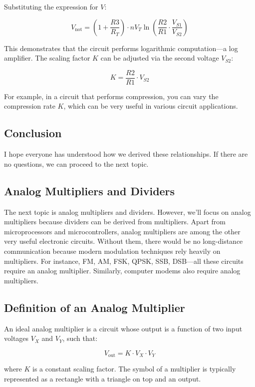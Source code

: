 Substituting the expression for \( V \):

\[
V_{\text{not}} = \left(1 + \frac{R3}{R_T}\right) \cdot n V_T \ln\left(\frac{R2}{R1} \cdot \frac{V_{S1}}{V_{S2}}\right)
\]

This demonstrates that the circuit performs logarithmic computation—a log amplifier. The scaling factor \( K \) can be adjusted via the second voltage \( V_{S2} \):

\[
K = \frac{R2}{R1} \cdot V_{S2}
\]

For example, in a circuit that performs compression, you can vary the compression rate \( K \), which can be very useful in various circuit applications.

\subsection*{Conclusion}

I hope everyone has understood how we derived these relationships. If there are no questions, we can proceed to the next topic.

\subsection*{Analog Multipliers and Dividers}

The next topic is analog multipliers and dividers. However, we'll focus on analog multipliers because dividers can be derived from multipliers. Apart from microprocessors and microcontrollers, analog multipliers are among the other very useful electronic circuits. Without them, there would be no long-distance communication because modern modulation techniques rely heavily on multipliers. For instance, FM, AM, FSK, QPSK, SSB, DSB—all these circuits require an analog multiplier. Similarly, computer modems also require analog multipliers.

\subsection*{Definition of an Analog Multiplier}

An ideal analog multiplier is a circuit whose output is a function of two input voltages \( V_X \) and \( V_Y \), such that:

\[
V_{\text{out}} = K \cdot V_X \cdot V_Y
\]

where \( K \) is a constant scaling factor. The symbol of a multiplier is typically represented as a rectangle with a triangle on top and an output.

